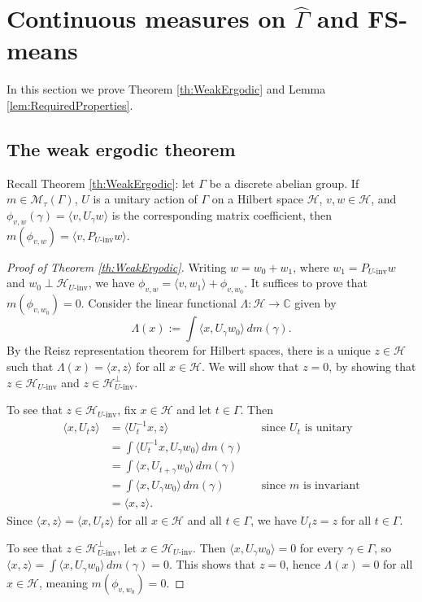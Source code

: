 \documentclass[12pt]{amsart} \usepackage{amsmath,centernot,amssymb,leftindex}
\numberwithin{theorem}{section}
\numberwithin{equation}{section}
\theoremstyle{definition}
\begin{document}
\section{Continuous measures on \texorpdfstring{$\widehat{\Gamma}$}{Gamma} and FS-means}\label{sec:Continuous}
In this section we prove Theorem \ref{th:WeakErgodic} and Lemma \ref{lem:RequiredProperties}.

\subsection{The weak ergodic theorem}

Recall Theorem \ref{th:WeakErgodic}: let $\Gamma$ be a discrete abelian group.	If $m\in \mathcal M_{\tau}(\Gamma)$, $U$ is a unitary action of $\Gamma$ on a Hilbert space $\mathcal H$, $v, w\in \mathcal H$, and $\phi_{v,w}(\gamma)=\langle v, U_{\gamma} w\rangle$ is the corresponding matrix coefficient, then $	m(\phi_{v,w})=\langle v, P_{U\text{-inv}} w\rangle.$
\begin{proof}[Proof of Theorem \ref{th:WeakErgodic}]
	Writing $w=w_{0}+w_{1}$, where $w_{1}=P_{U\text{-inv}}w$ and $w_{0}\perp \mathcal H_{U\text{-inv}}$, we have $\phi_{v,w}=\langle v, w_{1}\rangle+\phi_{v,w_{0}}$.  It suffices to prove that $m(\phi_{v,w_{0}})=0$.  Consider the linear functional $\Lambda:\mathcal H\to \mathbb C$ given by
	\[
	\Lambda(x) := \int \langle x, U_{\gamma }w_{0}\rangle \, dm(\gamma).
	\]
	By the Reisz representation theorem for Hilbert spaces, there is a unique $z\in \mathcal H$ such that $\Lambda(x)=\langle x,z\rangle$ for all $x\in \mathcal H$.  We will show that $z=0$, by showing that $z\in \mathcal H_{U\text{-inv}}$ and $z\in \mathcal H_{U\text{-inv}}^{\perp}$.
	
	To see that $z\in \mathcal{H}_{U\text{-inv}}$, fix $x\in \mathcal H$ and let $t \in \Gamma$.  Then \begin{align*}
		\langle x,U_{t} z\rangle &=\langle U_{t}^{-1} x, z\rangle && \text{since $U_{t}$ is unitary}\\
		&=\int \langle U_{t}^{-1} x, U_{\gamma} w_{0}\rangle\, dm(\gamma)\\
		&=\int \langle  x, U_{t+\gamma} w_{0}\rangle\, dm(\gamma)\\
		&= \int \langle x, U_{\gamma} w_{0}\rangle\, dm(\gamma)  && \text{since $m$ is invariant}\\
		&=\langle x, z\rangle.
	\end{align*}  Since $\langle x,z\rangle = \langle x, U_{t} z\rangle$ for all $x\in \mathcal H$ and all $t\in \Gamma$, we have $U_{t}z=z$ for all $t\in \Gamma$.
	
	To see that $z\in \mathcal{H}_{U\text{-inv}}^{\perp}$, let $x\in \mathcal{H}_{U\text{-inv}}$.  Then $\langle x, U_{\gamma} w_{0}\rangle = 0$ for every $\gamma\in \Gamma$, so	$\langle x,z\rangle=\int \langle x, U_{\gamma} w_{0}\rangle \, dm(\gamma)=0$. 	This shows that $z=0$, hence $\Lambda(x)=0$ for all $x\in \mathcal H$, meaning $m(\phi_{v,w_{0}})=0$.
\end{proof}
\end{document}
